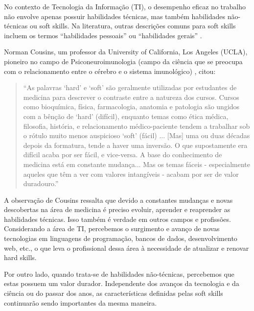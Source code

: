 No contexto de Tecnologia da Informação (TI), o desempenho eficaz no trabalho não envolve apenas possuir habilidades técnicas, mas também habilidades não-técnicas ou soft skills. Na literatura, outras descrições comuns para soft skills incluem os termos ``habilidades pessoais'' ou ``habilidades gerais'' \cite{joseph:99}.

Norman Cousins, um professor da University of California, Los Angeles (UCLA), pioneiro no campo de Psiconeuroimunologia (campo da ciência que se preocupa com o relacionamento entre o cérebro e o sistema imunológico) \cite{crosbie:05}, citou:

\begin{quote}
``As palavras `hard' e `soft' são geralmente utilizadas por estudantes de medicina para descrever o contraste entre a natureza dos cursos. Cursos como bioquímica, física, farmacologia, anatomia e patologia são ungidos com a bênção de `hard' (difícil), enquanto temas como ética médica, filosofia, história, e relacionamento médico-paciente tendem a trabalhar sob o rótulo muito menos auspicioso `soft' (fácil) 
... [Mas] uma ou duas décadas depois da formatura, tende a haver uma inversão. O que supostamente era difícil acaba por ser fácil, e vice-versa.
A base do conhecimento de medicina está em constante mudança... Mas os temas fáceis - especialmente aqueles que têm a ver com valores intangíveis - acabam por ser de valor duradouro.''
\end{quote}

A observação de Cousins ressalta que devido a constantes mudanças e novas descobertas na área de medicina é preciso evoluir, aprender e reaprender as habilidades técnicas. Isso também é verdade em outros campos e profissões. Considerando a área de TI, percebemos o surgimento e avanço de novas tecnologias em linguagens de programação, bancos de dados, desenvolvimento web, etc., o que leva o profissional dessa área à necessidade de atualizar e renovar hard skills.

Por outro lado, quando trata-se de habilidades não-técnicas, percebemos que estas possuem um valor durador. Independente dos avanços da tecnologia e da ciência ou do passar dos anos, as características definidas pelas soft skills continuarão sendo importantes da mesma maneira.

